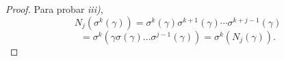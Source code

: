\begin{proof}
Para probar \textit{iii)},
    \[
    N_j(\sigma^k(\gamma)) = \sigma^k(\gamma)\sigma^{k+1}(\gamma)\cdots\sigma^{k+j-1}(\gamma)
\]
\[
    = \sigma^k(\gamma \sigma(\gamma)\dots\sigma^{j-1}(\gamma)) = \sigma^k(N_j(\gamma))
    .\]
\end{proof}
